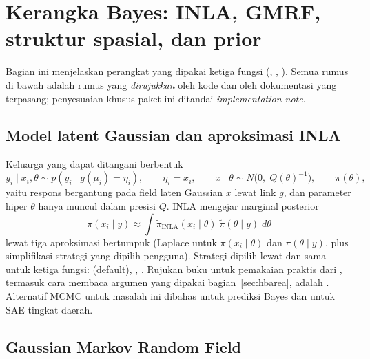 \section{Kerangka Bayes: INLA, GMRF, struktur spasial, dan prior}\label{sec:bayes}

Bagian ini menjelaskan perangkat yang dipakai ketiga fungsi 
(, , ). Semua rumus di bawah adalah
rumus yang \emph{dirujukkan} oleh kode dan oleh dokumentasi  yang
terpasang; penyesuaian khusus paket ini ditandai \emph{implementation note}.

\subsection{Model latent Gaussian dan aproksimasi INLA}\label{sec:inla}

Keluarga yang dapat ditangani  \citep{rue2009approximate} berbentuk
\begin{equation}
  y_i\mid x_i,\theta\sim p(y_i\mid g(\mu_i)=\eta_i),\qquad
  \eta_i=x_i,\qquad
  x\mid\theta\sim N\bigl(0,\;Q(\theta)^{-1}\bigr),\qquad
  \pi(\theta),
  \label{eq:lgm}
\end{equation}
yaitu respons bergantung pada field laten Gaussian $x$ lewat link $g$, dan
parameter hiper $\theta$ hanya muncul dalam presisi $Q$. INLA mengejar
marginal posterior
\begin{equation}
  \pi(x_i\mid y)\approx
  \int \tilde\pi_{\text{INLA}}(x_i\mid\theta)\;
       \tilde\pi(\theta\mid y)\;d\theta
  \label{eq:inla-approx}
\end{equation}
lewat tiga aproksimasi bertumpuk (Laplace untuk $\pi(x_i\mid\theta)$ dan
$\pi(\theta\mid y)$, plus simplifikasi strategi yang dipilih pengguna).
Strategi dipilih lewat  dan sama untuk ketiga
fungsi:  (default), , .
Rujukan buku untuk pemakaian praktis  dari , termasuk
cara membaca argumen  yang dipakai
bagian~\ref{sec:hbarea}, adalah \citet{gomez-rubio2020bayesian}.
Alternatif MCMC untuk masalah ini dibahas \citet{datta1991bayesian} untuk
prediksi Bayes dan \citet{molina2015sae} untuk SAE tingkat daerah.

\subsection{Gaussian Markov Random Field}\label{sec:gmrf}

